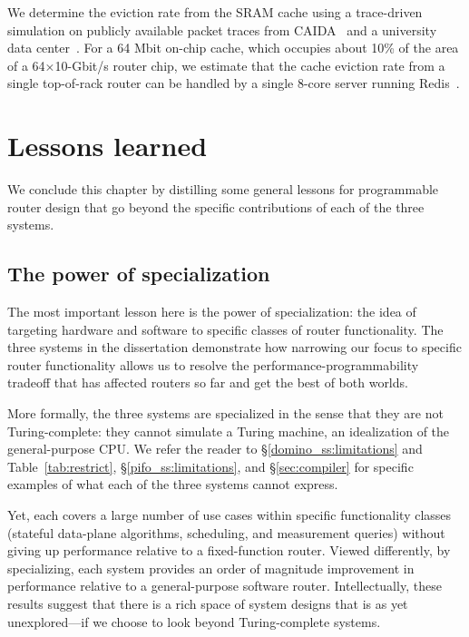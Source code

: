  We determine the eviction rate from the SRAM cache using a trace-driven
simulation on publicly available packet traces from CAIDA~\cite{caida2016,
caida2014} and a university data center~\cite{theo_dc}. For a 64 Mbit on-chip
cache, which occupies about 10\% of the area of a 64×10-Gbit/s router chip,
we estimate that the cache eviction rate from a single top-of-rack router can
be handled by a single 8-core server running Redis~\cite{redis}.

\section{Lessons learned} We conclude this chapter by distilling some general
lessons for programmable router design that go beyond the specific
contributions of each of the three systems.

\subsection{The power of specialization} The most important lesson here is the
power of specialization: the idea of targeting hardware and software to
specific classes of router functionality.  The three systems in the
dissertation demonstrate how narrowing our focus to specific router
functionality allows us to resolve the performance-programmability tradeoff
that has affected routers so far and get the best of both worlds.

More formally, the three systems are specialized in the sense that they are not
Turing-complete: they cannot simulate a Turing machine, an idealization of the
general-purpose CPU.  We refer the reader to \S\ref{domino_ss:limitations} and
Table~\ref{tab:restrict}, \S\ref{pifo_ss:limitations}, and \S\ref{sec:compiler}
for specific examples of what each of the three systems cannot express.

Yet, each covers a large number of use cases within specific functionality
classes (stateful data-plane algorithms, scheduling, and measurement queries)
without giving up performance relative to a fixed-function router. Viewed
differently, by specializing, each system provides an order of magnitude
improvement in performance relative to a general-purpose software router.
Intellectually, these results suggest that there is a rich space of system
designs that is as yet unexplored---if we choose to look beyond Turing-complete
systems. 

